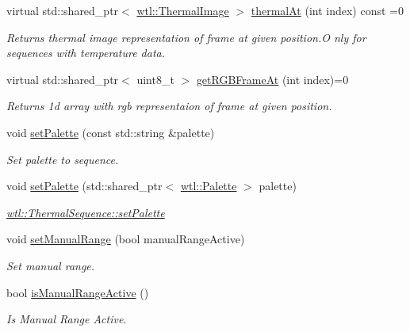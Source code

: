 \begin{DoxyCompactItemize}
virtual std\+::shared\+\_\+ptr$<$ \hyperlink{classwtl_1_1_thermal_image}{wtl\+::\+Thermal\+Image} $>$ \hyperlink{classwtl_1_1_thermal_sequence_afa7db744c4112df11b20026eae1da399}{thermal\+At} (int index) const =0
\begin{DoxyCompactList}\small\item\em Returns thermal image representation of frame at given position.\+O nly for sequences with temperature data. \end{DoxyCompactList}\item 
virtual std\+::shared\+\_\+ptr$<$ uint8\+\_\+t $>$ \hyperlink{classwtl_1_1_thermal_sequence_a0d13f29f0f89343516031c5146b62792}{get\+R\+G\+B\+Frame\+At} (int index)=0
\begin{DoxyCompactList}\small\item\em Returns 1d array with rgb representaion of frame at given position. \end{DoxyCompactList}\item 
void \hyperlink{classwtl_1_1_thermal_sequence_a47103fe0b8c101c0d2b77499f464de93}{set\+Palette} (const std\+::string \&palette)
\begin{DoxyCompactList}\small\item\em Set palette to sequence. \end{DoxyCompactList}\item 
void \hyperlink{classwtl_1_1_thermal_sequence_a5535a6cf8de61dbcf0c3d49f186c7370}{set\+Palette} (std\+::shared\+\_\+ptr$<$ \hyperlink{classwtl_1_1_palette}{wtl\+::\+Palette} $>$ palette)
\begin{DoxyCompactList}\small\item\em \hyperlink{classwtl_1_1_thermal_sequence_a47103fe0b8c101c0d2b77499f464de93}{wtl\+::\+Thermal\+Sequence\+::set\+Palette} \end{DoxyCompactList}\item 
void \hyperlink{classwtl_1_1_thermal_sequence_aedae757f2de72cee3dd3b74a5939c750}{set\+Manual\+Range} (bool manual\+Range\+Active)
\begin{DoxyCompactList}\small\item\em Set manual range. \end{DoxyCompactList}\item 
bool \hyperlink{classwtl_1_1_thermal_sequence_a7d3fb395f892aa2c040c889d2c4dc4ce}{is\+Manual\+Range\+Active} ()
\begin{DoxyCompactList}\small\item\em Is Manual Range Active. \end{DoxyCompactList}\item 

\end{DoxyCompactItemize}
